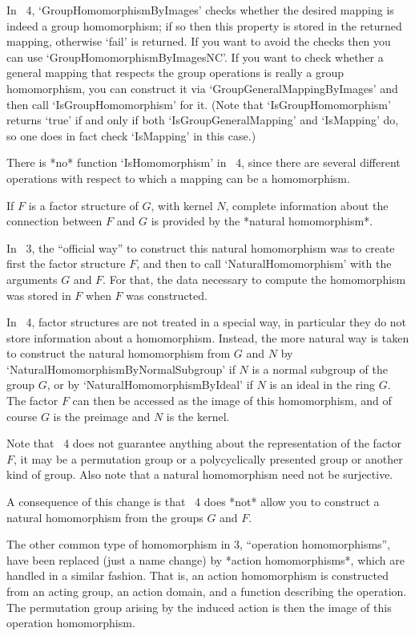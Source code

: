 In {\GAP}~4, `GroupHomomorphismByImages' checks whether the desired
mapping is indeed a group homomorphism; if so then this property is
stored in the returned mapping, otherwise `fail' is returned.  If you
want to avoid the checks then you can use
`GroupHomomorphismByImagesNC'.  If you want to check whether a general
mapping that respects the group operations is really a group
homomorphism, you can construct it via `GroupGeneralMappingByImages'
and then call `IsGroupHomomorphism' for it.  (Note that
`IsGroupHomomorphism' returns `true' if and only if both
`IsGroupGeneralMapping' and `IsMapping' do, so one does in fact check
`IsMapping' in this case.)

There is *no* function `IsHomomorphism' in {\GAP}~4,
since there are several different operations with respect to which a
mapping can be a homomorphism.



If $F$ is a factor structure of $G$, with kernel $N$, complete
information about the connection between $F$ and $G$ is provided by
the *natural homomorphism*.

In {\GAP}~3, the ``official way'' to construct this natural homomorphism
was to create first the factor structure $F$, and then to call
`NaturalHomomorphism' with the arguments $G$ and $F$.
For that, the data necessary to compute the homomorphism was stored in
$F$ when $F$ was constructed.

In {\GAP}~4, factor structures are not treated in a special way,
in particular they do not store information about a homomorphism.
Instead, the more natural way is taken to construct the natural
homomorphism from $G$ and $N$ by `NaturalHomomorphismByNormalSubgroup'
if $N$ is a normal subgroup of the group $G$,
or by `NaturalHomomorphismByIdeal' if $N$ is an ideal in the ring $G$.
The factor $F$ can then be accessed as the image of this homomorphism,
and of course $G$ is the preimage and $N$ is the kernel.

Note that {\GAP}~4 does not guarantee anything about the representation
of the factor $F$, it may be a permutation group or a polycyclically
presented group or another kind of group.
Also note that a natural homomorphism need not be surjective.

A consequence of this change is that {\GAP}~4 does *not* allow you to
construct a natural homomorphism from the groups $G$ and $F$.

The other common type of homomorphism in {\GAP} 3, ``operation
homomorphisms'', have been replaced (just a name change) by *action
homomorphisms*, which are handled in a similar fashion.  That is, an
action homomorphism is constructed from an acting group, an action
domain, and a function describing the operation.  The permutation
group arising by the induced action is then the image of this
operation homomorphism.


